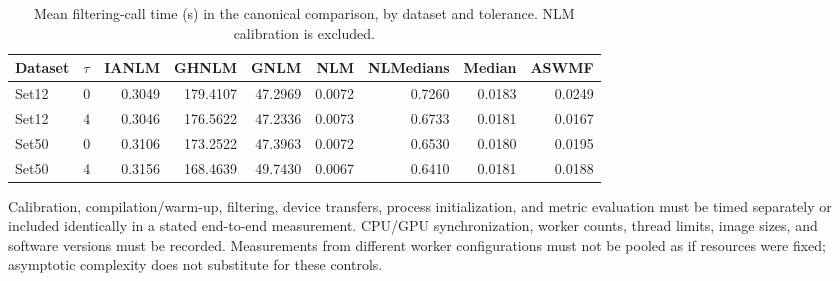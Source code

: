 \documentclass[pdflatex,iicol,sn-mathphys-num]{sn-jnl}
\newif\ifshowportuguese
\newcommand{\pt}[1]{\ifshowportuguese\par\begingroup\small\color{blue!55!black}\noindent\textbf{PT: }#1\par\endgroup\fi}
\begin{document}
\begin{table}[!t]
  \centering
  \caption{Mean filtering-call time (s) in the canonical comparison, by dataset and tolerance. NLM calibration is excluded.}
  \label{tab:official_timing}
  \small
  \setlength{\tabcolsep}{4pt}
  \begin{tabular}{llrrrrrrr}
  \toprule
  Dataset & $\tau$ & IANLM & GHNLM & GNLM & NLM & NLMedians & Median & ASWMF\\
  \midrule
  Set12 & 0 & 0.3049 & 179.4107 & 47.2969 & 0.0072 & 0.7260 & 0.0183 & 0.0249\\
  Set12 & 4 & 0.3046 & 176.5622 & 47.2336 & 0.0073 & 0.6733 & 0.0181 & 0.0167\\
  Set50 & 0 & 0.3106 & 173.2522 & 47.3963 & 0.0072 & 0.6530 & 0.0180 & 0.0195\\
  Set50 & 4 & 0.3156 & 168.4639 & 49.7430 & 0.0067 & 0.6410 & 0.0181 & 0.0188\\
  \bottomrule
  \end{tabular}
\end{table}

Calibration, compilation/warm-up, filtering, device transfers, process initialization, and metric evaluation must be timed separately or included identically in a stated end-to-end measurement. CPU/GPU synchronization, worker counts, thread limits, image sizes, and software versions must be recorded. Measurements from different worker configurations must not be pooled as if resources were fixed; asymptotic complexity does not substitute for these controls.
\pt{Calibração, compilação/aquecimento, filtragem, transferências de dispositivo, inicialização de processos e avaliação de métricas precisam ser cronometradas separadamente ou incluídas de forma idêntica em uma medição ponta a ponta declarada. Sincronização CPU/GPU, número de processos, limites de threads, tamanhos de imagem e versões de software precisam ser registrados. Medições com números diferentes de processos não podem ser agrupadas como se os recursos fossem fixos; a complexidade assintótica não substitui esses controles.}
\end{document}
